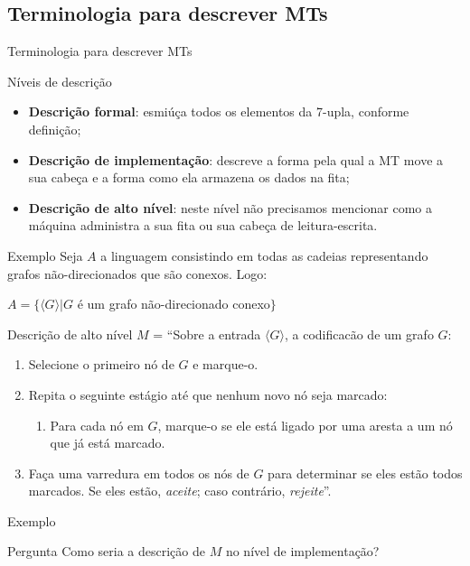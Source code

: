 \documentclass[xcolor=dvipsnames,table]{beamer}
\begin{document}
	\subsection{Terminologia para descrever MTs}
	\begin{frame}{Terminologia para descrever MTs}
		\begin{block}{Níveis de descrição}
			\begin{itemize}
				\item<1,4> {\bf Descrição formal}: esmiúça todos os elementos da 7-upla, conforme definição;
				\item<2,4> {\bf Descrição de implementação}: descreve a forma pela qual a MT move a sua cabeça e a forma como ela armazena os dados na fita;
				\item<3,4> {\bf Descrição de alto nível}: neste nível não precisamos mencionar como a máquina administra a sua fita ou sua cabeça de leitura-escrita.
			\end{itemize}
		\end{block}
	\end{frame}
	
	\begin{frame}[shrink]{Exemplo}
		Seja $A$ a linguagem consistindo em todas as cadeias representando grafos não-direcionados que são conexos. Logo:
		\begin{center}
			$A = \{\langle G \rangle | G$ é um grafo não-direcionado conexo$\}$
		\end{center}\pause		
		\begin{block}{Descrição de alto nível}
			$M$ = ``Sobre a entrada $\langle G \rangle$, a codificacão de um grafo $G$:
			\begin{enumerate}
				\item Selecione o primeiro nó de $G$ e marque-o.
				\item Repita o seguinte estágio até que nenhum novo nó seja marcado:
					\begin{enumerate}
						\item Para cada nó em $G$, marque-o se ele está ligado por uma aresta a um nó que já está marcado.
					\end{enumerate}
				\item Faça uma varredura em todos os nós de $G$ para determinar se eles estão todos marcados. Se eles estão, {\it aceite}; caso contrário, {\it rejeite}''.
			\end{enumerate}
		\end{block}
	\end{frame}
	
	\begin{frame}{Exemplo}
		\begin{block}{Pergunta}
			Como seria a descrição de $M$ no nível de implementação?
		\end{block}
	\end{frame}
	
	\begin{frame}
		\titlepage
	\end{frame}
	
\end{document}
